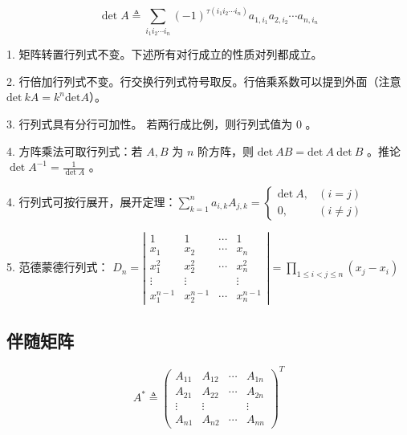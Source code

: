 $$
\operatorname{det} A \triangleq \sum_{i_1i_2 \cdots i_n}(-1)^{\tau\left(i_1 i_2 \cdots i_n\right)} a_{1,i_1} a_{2,i_2} \cdots a_{n,i_n}
$$

1. 矩阵转置行列式不变。下述所有对行成立的性质对列都成立。

2. 行倍加行列式不变。行交换行列式符号取反。行倍乘系数可以提到外面（注意 $\text{det}\ kA = k^n\text{det} A$）。

3. 行列式具有分行可加性。 若两行成比例，则行列式值为 $0$ 。

4. 方阵乘法可取行列式：若 $A,B$ 为 $n$ 阶方阵，则 $\text{det}\ AB = \text{det}\ A\ \text{det}\ B$ 。推论 $\operatorname{det} A^{-1}=\displaystyle \frac{1}{\operatorname{det} A}$ 。

\vspace{0.2cm}

4. 行列式可按行展开，展开定理：$
\sum_{k=1}^n a_{i,k} A_{j,k}=\left\{\begin{array}{cc}
\text{det}\ A, & (i=j) \\
0, & (i \neq j)
\end{array}\right.$

\vspace{0.2cm}

5. 范德蒙德行列式： $
D_n=\left|\begin{array}{cccc}
1 & 1 & \cdots & 1 \\
x_1 & x_2 & \cdots & x_n \\
x_1^2 & x_2^2 & \cdots & x_n^2 \\
\vdots & \vdots & & \vdots \\
x_1^{n-1} & x_2^{n-1} & \cdots & x_n^{n-1}
\end{array}\right|=\prod_{1 \leq i<j \leq n}\left(x_j-x_i\right)
$

\vspace{0.2cm}

\vspace{0.2cm}



\newpage

\subsection{伴随矩阵}

\vspace{-0.2cm}

$$
A^* \triangleq\left(\begin{array}{cccc}
A_{11} & A_{12} & \cdots & A_{1 n} \\
A_{21} & A_{22} & \cdots & A_{2 n} \\
\vdots & \vdots & & \vdots \\
A_{n 1} & A_{n 2} & \cdots & A_{n n}
\end{array}\right)^T
$$

